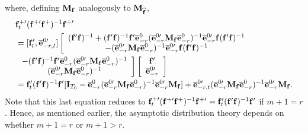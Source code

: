 \documentclass[12pt,fleqn]{article}
\begin{document}
where, defining $\mathbf{M}_{\mathbf{f}}$ analogously to $\mathbf{M}_{\widehat{\mathbf{f}}}$,
\begin{align}
& \mathbf{f}_t^{+\prime}(\mathbf{f}^{+\prime}\mathbf{f}^+)^{-1}\mathbf{f}^{+\prime} \notag\\
& = [\mathbf{f}_t', \overline{\mathbf{e}}_{-r,t}^{0\prime}]\left[\begin{array}{c} (\mathbf{f}'\mathbf{f})^{-1} + (\mathbf{f}'\mathbf{f})^{-1}\mathbf{f}'\overline{\mathbf{e}}_{-r}^0(\overline{\mathbf{e}}_{-r}^{0\prime}\mathbf{M}_{\mathbf{f}}\overline{\mathbf{e}}_{-r}^0)^{-1}\overline{\mathbf{e}}_{-r}^{0\prime} \mathbf{f}(\mathbf{f}'\mathbf{f})^{-1}  \\
-(\overline{\mathbf{e}}_{-r}^{0\prime}\mathbf{M}_{\mathbf{f}}\overline{\mathbf{e}}_{-r}^0)^{-1}\overline{\mathbf{e}}_{-r}^{0\prime}\mathbf{f} (\mathbf{f}'\mathbf{f})^{-1} \end{array}\right. \notag\\
& \left. \begin{array}{c}  -(\mathbf{f}'\mathbf{f})^{-1}\mathbf{f}'\overline{\mathbf{e}}_{-r}^0(\overline{\mathbf{e}}_{-r}^{0\prime}\mathbf{M}_{\mathbf{f}}\overline{\mathbf{e}}_{-r}^0)^{-1} \\
 (\overline{\mathbf{e}}_{-r}^{0\prime}\mathbf{M}_{\mathbf{f}}\overline{\mathbf{e}}_{-r}^0)^{-1} \end{array}\right]\left[\begin{array}{c} \mathbf{f}' \\
    \overline{\mathbf{e}}_{-r}^{0\prime} \end{array}\right]  \notag\\
& = \mathbf{f}_t'(\mathbf{f}'\mathbf{f})^{-1}\mathbf{f}'[\mathbf{I}_{T_0} -  \overline{\mathbf{e}}_{-r}^{0}(\overline{\mathbf{e}}_{-r}^{0\prime}\mathbf{M}_{\mathbf{f}}\overline{\mathbf{e}}_{-r}^0)^{-1} \overline{\mathbf{e}}_{-r}^{0\prime}\mathbf{M}_{\mathbf{f}}] + \overline{\mathbf{e}}_{-r,t}^{0\prime}(\overline{\mathbf{e}}_{-r}^{0\prime}\mathbf{M}_{\mathbf{f}}\overline{\mathbf{e}}_{-r}^0)^{-1}\overline{\mathbf{e}}_{-r}^{0\prime}\mathbf{M}_{\mathbf{f}}.
\end{align}
Note that this last equation reduces to $\mathbf{f}_t^{+\prime}(\mathbf{f}^{+\prime}\mathbf{f}^+)^{-1}\mathbf{f}^{+\prime} = \mathbf{f}_t'(\mathbf{f}'\mathbf{f})^{-1}\mathbf{f}'$ if $m+1=r$. Hence, as mentioned earlier, the asymptotic distribution theory depends on whether $m+1=r$ or $m+1> r$.
\end{document}
